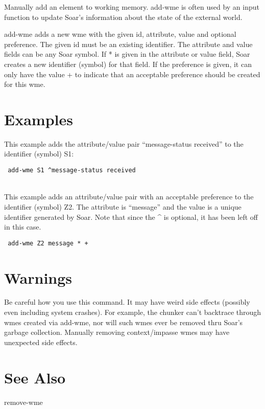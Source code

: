 \documentclass[10pt]{article}
\begin{document}
 Manually add an element to working memory. add-wme is often used by an input function to update Soar's information about the state of the external world. 


 add-wme adds a new wme with the given id, attribute, value and optional preference. The given id must be an existing identifier. The attribute and value fields can be any Soar symbol. If * is given in the attribute or value field, Soar creates a new identifier (symbol) for that field. If the preference is given, it can only have the value + to indicate that an acceptable preference should be created for this wme. 
\section*{ Examples }


 This example adds the attribute/value pair ``message-status received'' to the identifier (symbol) S1: \begin{verbatim}
 add-wme S1 ^message-status received

\end{verbatim}



 \\ 
 This example adds an attribute/value pair with an acceptable preference to the identifier (symbol) Z2. The attribute is ``message'' and the value is a unique identifier generated by Soar. Note that since the \^{} is optional, it has been left off in this case. \begin{verbatim}
 add-wme Z2 message * + 

\end{verbatim}

\section*{ Warnings }


 Be careful how you use this command. It may have weird side effects (possibly even including system crashes). For example, the chunker can't backtrace through wmes created via add-wme, nor will such wmes ever be removed thru Soar's garbage collection. Manually removing context/impasse wmes may have unexpected side effects. 
\section*{ See Also }


 remove-wme


 \\ 
\end{document}
